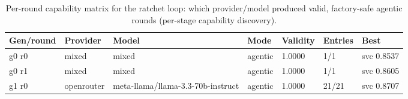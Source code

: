 \begin{table}[H]
\centering\small
\caption{Per-round capability matrix for the ratchet loop: which provider/model produced valid, factory-safe agentic rounds (per-stage capability discovery).}
\label{tab:ratchet-rounds-ratchet-ledger-hr-attrition}
\begin{tabular}{lllllll}
\toprule
Gen/round & Provider & Model & Mode & Validity & Entries & Best \\
\midrule
g0 r0 & mixed & mixed & agentic & 1.0000 & 1/1 & svc 0.8537 \\
g0 r1 & mixed & mixed & agentic & 1.0000 & 1/1 & svc 0.8605 \\
g1 r0 & openrouter & meta-llama/llama-3.3-70b-instruct & agentic & 1.0000 & 21/21 & svc 0.8707 \\
\bottomrule
\end{tabular}
\end{table}
